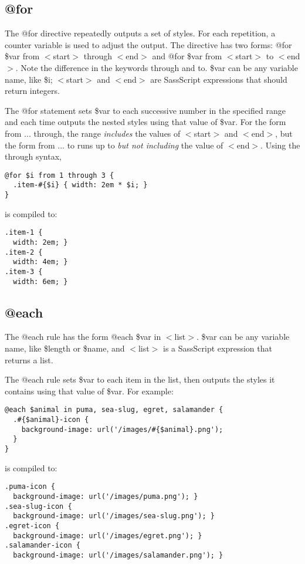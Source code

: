 \documentclass[9pt]{article}
\begin{document}
\subsection{@for}


 The @for directive repeatedly outputs a set of styles. For each repetition, a counter variable is used to adjust the output. The directive has two forms: @for \$var from $<$start$>$ through $<$end$>$ and @for \$var from $<$start$>$ to $<$end$>$. Note the difference in the keywords through and to. \$var can be any variable name, like \$i; $<$start$>$ and $<$end$>$ are SassScript expressions that should return integers.


 The @for statement sets \$var to each successive number in the specified range and each time outputs the nested styles using that value of \$var. For the form from ... through, the range \emph{includes}
 the values of $<$start$>$ and $<$end$>$, but the form from ... to runs up to \emph{but not including}
 the value of $<$end$>$. Using the through syntax,
\begin{verbatim}
@for $i from 1 through 3 {
  .item-#{$i} { width: 2em * $i; }
}
\end{verbatim}


 is compiled to:
\begin{verbatim}
.item-1 {
  width: 2em; }
.item-2 {
  width: 4em; }
.item-3 {
  width: 6em; }
\end{verbatim}
\subsection{@each}


 The @each rule has the form @each \$var in $<$list$>$. \$var can be any variable name, like \$length or \$name, and $<$list$>$ is a SassScript expression that returns a list.


 The @each rule sets \$var to each item in the list, then outputs the styles it contains using that value of \$var. For example:
\begin{verbatim}
@each $animal in puma, sea-slug, egret, salamander {
  .#{$animal}-icon {
    background-image: url('/images/#{$animal}.png');
  }
}
\end{verbatim}


 is compiled to:
\begin{verbatim}
.puma-icon {
  background-image: url('/images/puma.png'); }
.sea-slug-icon {
  background-image: url('/images/sea-slug.png'); }
.egret-icon {
  background-image: url('/images/egret.png'); }
.salamander-icon {
  background-image: url('/images/salamander.png'); }
\end{verbatim}
\end{document}
